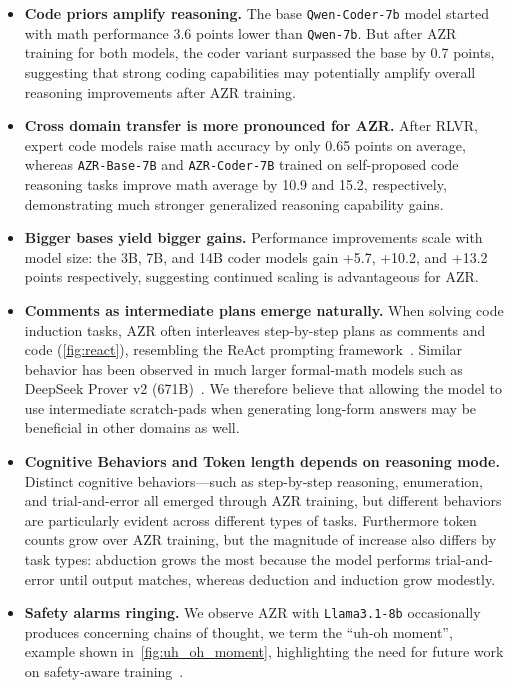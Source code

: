 \documentclass{article}
\begin{document}
\begin{itemize}[leftmargin=*]
    \item \textbf{Code priors amplify reasoning.}  
    The base \texttt{Qwen-Coder-7b} model started with math performance 3.6 points lower than \texttt{Qwen-7b}. But after AZR training for both models, the coder variant surpassed the base by 0.7 points, suggesting that strong coding capabilities may potentially amplify overall reasoning improvements after AZR training.

    \item \textbf{Cross domain transfer is more pronounced for AZR.}  
    After RLVR, expert code models raise math accuracy by only 0.65 points on average, whereas \texttt{AZR‑Base‑7B} and \texttt{AZR‑Coder‑7B} trained on self-proposed code reasoning tasks improve math average by 10.9 and 15.2, respectively, demonstrating much stronger generalized reasoning capability gains.

    \item \textbf{Bigger bases yield bigger gains.}  
    Performance improvements scale with model size: the 3B, 7B, and 14B coder models gain +5.7, +10.2, and +13.2 points respectively, suggesting continued scaling is advantageous for AZR.

    \item \textbf{Comments as intermediate plans emerge naturally.}  
    When solving code induction tasks, AZR often interleaves step-by-step plans as comments and code (\cref{fig:react}), resembling the ReAct prompting framework~\citep{yao2023react}. Similar behavior has been observed in much larger formal-math models such as DeepSeek Prover v2 (671B)~\citep{ren2025deepseekproverv2advancingformalmathematical}. We therefore believe that allowing the model to use intermediate scratch-pads when generating long-form answers may be beneficial in other domains as well.

    \item \textbf{Cognitive Behaviors and Token length depends on reasoning mode.}  
    Distinct cognitive behaviors—such as step-by-step reasoning, enumeration, and trial-and-error all emerged through AZR training, but different behaviors are particularly evident across different types of tasks. Furthermore token counts grow over AZR training, but the magnitude of increase also differs by task types: abduction grows the most because the model performs trial-and-error until output matches, whereas deduction and induction grow modestly.

    \item \textbf{Safety alarms ringing.}  
    We observe AZR with \texttt{Llama3.1-8b} occasionally produces concerning chains of thought, we term the ``uh‑oh moment'', example shown in~\cref{fig:uh_oh_moment}, highlighting the need for future work on safety‑aware training~\citep{zhang2025100}.
\end{itemize}
\end{document}
